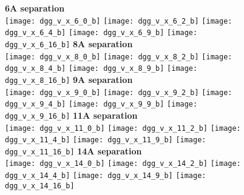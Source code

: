 \documentclass[journal=acsnano,manuscript=article]{achemso}
\begin{document}
\begin{figure}[h!]
	\centering
	\textbf{6A separation} \\
	\texttt{[image: dgg\_v\_x\_6\_0\_b]} 
	\texttt{[image: dgg\_v\_x\_6\_2\_b]}
	\texttt{[image: dgg\_v\_x\_6\_4\_b]}
	\texttt{[image: dgg\_v\_x\_6\_9\_b]}
	\texttt{[image: dgg\_v\_x\_6\_16\_b]}
	\textbf{8A separation} \\
	\texttt{[image: dgg\_v\_x\_8\_0\_b]} 
	\texttt{[image: dgg\_v\_x\_8\_2\_b]}
	\texttt{[image: dgg\_v\_x\_8\_4\_b]}
	\texttt{[image: dgg\_v\_x\_8\_9\_b]}
	\texttt{[image: dgg\_v\_x\_8\_16\_b]}
	\textbf{9A separation} \\
	\texttt{[image: dgg\_v\_x\_9\_0\_b]} 
	\texttt{[image: dgg\_v\_x\_9\_2\_b]}
	\texttt{[image: dgg\_v\_x\_9\_4\_b]}
	\texttt{[image: dgg\_v\_x\_9\_9\_b]}
	\texttt{[image: dgg\_v\_x\_9\_16\_b]}
	\textbf{11A separation} \\
	\texttt{[image: dgg\_v\_x\_11\_0\_b]} 
	\texttt{[image: dgg\_v\_x\_11\_2\_b]}
	\texttt{[image: dgg\_v\_x\_11\_4\_b]}
	\texttt{[image: dgg\_v\_x\_11\_9\_b]}
	\texttt{[image: dgg\_v\_x\_11\_16\_b]}
	\textbf{14A separation} \\
	\texttt{[image: dgg\_v\_x\_14\_0\_b]} 
	\texttt{[image: dgg\_v\_x\_14\_2\_b]}
	\texttt{[image: dgg\_v\_x\_14\_4\_b]}
	\texttt{[image: dgg\_v\_x\_14\_9\_b]}
	\texttt{[image: dgg\_v\_x\_14\_16\_b]}
	\label{fig:ang}
\end{figure}
\end{document}
